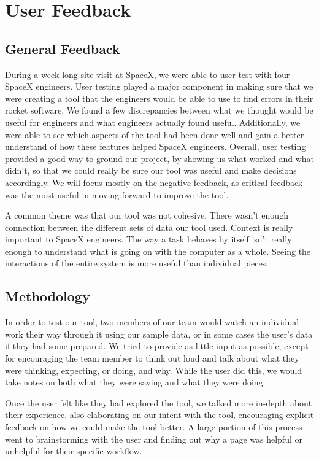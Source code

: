 \documentclass{hmcclinic}
\begin{document}
\chapter{User Feedback} %
\section{General Feedback} %
During a week long site visit at SpaceX, we were able to user test with four SpaceX engineers. 
User testing played a major component in making sure that we were creating a
tool that the engineers would be able to use to find errors in their rocket
software. We found a few discrepancies between what we thought would be useful
for engineers and what engineers actually found useful. Additionally, we were
able to see which aspects of the tool had been done well and gain a better
understand of how these features helped SpaceX engineers. Overall, user testing
provided a good way to ground our project, by showing us what worked and what
didn't, so that we could really be sure our tool was useful and make decisions
accordingly. We will focus mostly on the negative feedback, as critical feedback
was the most useful in moving forward to improve the tool.

A common theme was that our tool was not cohesive. There wasn't enough
connection between the different sets of data our tool used. Context is really
important to SpaceX engineers. The way a task behaves by itself isn't really
enough to understand what is going on with the computer as a whole. Seeing the
interactions of the entire system is more useful than individual pieces.

\section{Methodology} %
In order to test our tool, two members of our team would watch an individual
work their way through it using our sample data, or in some cases the user's
data if they had some prepared. We tried to provide as little
input as possible, except for encouraging the team member to think out loud and
talk about what they were thinking, expecting, or doing, and why. While the user
did this, we would take notes on both what they were saying and what they were
doing.

Once the user felt like they had explored the tool, we talked more in-depth
about their experience, also elaborating on our intent with the tool,
encouraging explicit feedback on how we could make the tool better. A large
portion of this process went to brainstorming with the user and finding out why
a page was helpful or unhelpful for their specific workflow.
\end{document}
